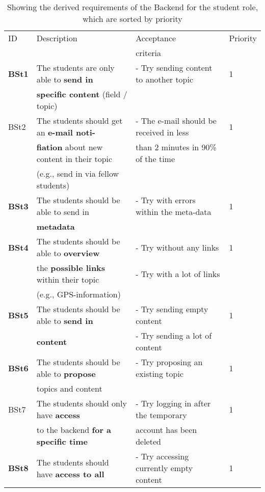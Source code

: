 \documentclass[twoside,openright,fleqn,pointlessnumbers,headinclude,,11pt,a4paper,BCOR5mm,footinclude,cleardoubleempty,abstracton %
                ]{scrreprt}
\begin{document}
	\begin{table}[h]
			\caption{Showing the derived requirements of the Backend for the student role, which are sorted by priority}
	\centering%
	\begin{tabular}{llll}
	\hline
	ID 	& Description 	& Acceptance 	& Priority \\
	 	& 			 & criteria 	&  \\
		\hline
	\textbf{BSt1} & The students are only able to \textbf{send in} 		& - Try sending content to another topic & 1	\\
	 	& \textbf{specific content} (field / topic) 				&  & 		\\
	\hline
	BSt2	& The students should get an \textbf{e-mail noti-} 	& - The e-mail should be received in less & 1	\\
	 	& \textbf{fiation} about new content in their topic 	& than 2 minutes in 90\% of the time & 	\\
	 	& (e.g., send in via fellow students) 			&  & 	\\
	\hline
	\textbf{BSt3} & The students should be able to send in  		& - Try with errors within the meta-data & 1\\
	 	& \textbf{metadata} 							&  & \\
	\hline
	\textbf{BSt4} & The students should be able to \textbf{overview} 	& - Try without any links & 1\\
	 	& the \textbf{possible links} within their topic 			& - Try with a lot of links & \\
	 	& (e.g., GPS-information) 						&  & \\
	\hline
	\textbf{BSt5} & The students should be able to \textbf{send in}  		& - Try sending empty content  & 1\\
	 	& \textbf{content}								& - Try sending a lot of content  & \\
	\hline
	\textbf{BSt6} & The students should be able to \textbf{propose}  	& - Try proposing an existing topic  & 1\\
	 	& topics and content  				    			&  & \\
	\hline
	BSt7 & The students should only have \textbf{access}  		& - Try logging in after the temporary & 1\\
		& to the backend \textbf{for a specific time} 			& account has been deleted	& \\	
	\hline
	\textbf{BSt8} & The students should have \textbf{access to all} 		& - Try accessing currently empty content  	& 1\\

\end{tabular}
\end{table}
\end{document}
